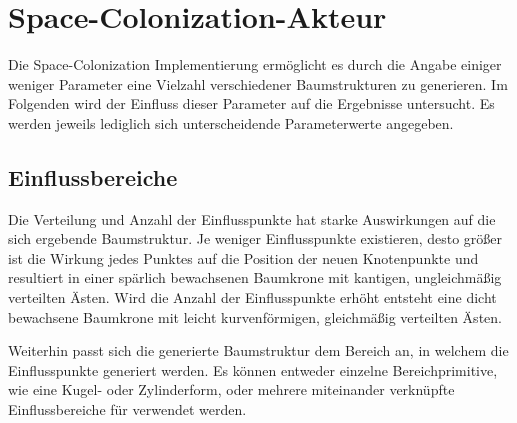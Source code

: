 \section{Space-Colonization-Akteur}

Die Space-Colonization Implementierung ermöglicht es durch die Angabe einiger weniger Parameter eine Vielzahl verschiedener Baumstrukturen zu generieren. \cite[S.3]{SpaceColonizationAlgorithm:07} Im Folgenden wird der Einfluss dieser Parameter auf die Ergebnisse untersucht. Es werden jeweils lediglich sich unterscheidende Parameterwerte angegeben.

\subsection{Einflussbereiche}

Die Verteilung und Anzahl der Einflusspunkte hat starke Auswirkungen auf die sich ergebende Baumstruktur. Je weniger Einflusspunkte existieren, desto größer ist die Wirkung jedes Punktes auf die Position der neuen Knotenpunkte und resultiert in einer spärlich bewachsenen Baumkrone mit kantigen, ungleichmäßig verteilten Ästen. Wird die Anzahl der Einflusspunkte erhöht entsteht eine dicht bewachsene Baumkrone mit leicht kurvenförmigen, gleichmäßig verteilten Ästen.

Weiterhin passt sich die generierte Baumstruktur dem Bereich an, in welchem die Einflusspunkte generiert werden. Es können entweder einzelne Bereichprimitive, wie eine Kugel- oder Zylinderform, oder mehrere miteinander verknüpfte Einflussbereiche für verwendet werden.

